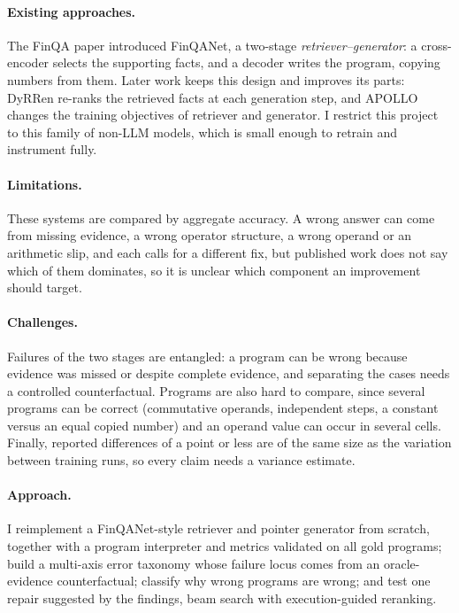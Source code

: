 \documentclass{article}
\begin{document}
\paragraph{Existing approaches.} The FinQA paper introduced FinQANet, a two-stage \emph{retriever--generator}: a cross-encoder selects the supporting facts, and a decoder writes the program, copying numbers from them. Later work keeps this design and improves its parts: DyRRen \citep{li2023dyrren} re-ranks the retrieved facts at each generation step, and APOLLO \citep{sun2022apollo} changes the training objectives of retriever and generator. I restrict this project to this family of non-LLM models, which is small enough to retrain and instrument fully.

\paragraph{Limitations.} These systems are compared by aggregate accuracy. A wrong answer can come from missing evidence, a wrong operator structure, a wrong operand or an arithmetic slip, and each calls for a different fix, but published work does not say which of them dominates, so it is unclear which component an improvement should target.

\paragraph{Challenges.} Failures of the two stages are entangled: a program can be wrong because evidence was missed or despite complete evidence, and separating the cases needs a controlled counterfactual. Programs are also hard to compare, since several programs can be correct (commutative operands, independent steps, a constant versus an equal copied number) and an operand value can occur in several cells. Finally, reported differences of a point or less are of the same size as the variation between training runs, so every claim needs a variance estimate.

\paragraph{Approach.} I reimplement a FinQANet-style retriever and pointer generator from scratch, together with a program interpreter and metrics validated on all gold programs; build a multi-axis error taxonomy whose failure locus comes from an oracle-evidence counterfactual; classify why wrong programs are wrong; and test one repair suggested by the findings, beam search with execution-guided reranking.
\end{document}
